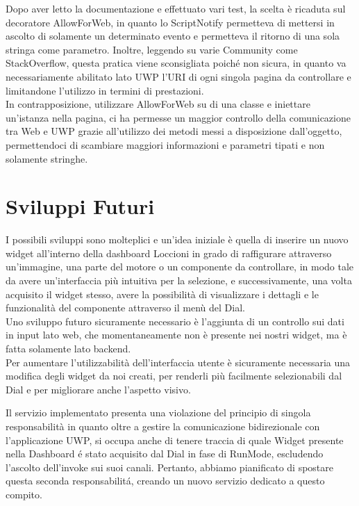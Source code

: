 Dopo aver letto la documentazione e effettuato vari test, la scelta è ricaduta sul decoratore AllowForWeb, in quanto lo ScriptNotify permetteva di mettersi in ascolto di solamente un determinato evento e permetteva il ritorno di una sola stringa come parametro.
Inoltre, leggendo su varie Community come StackOverflow, questa pratica viene sconsigliata poiché non sicura, in quanto va necessariamente abilitato lato UWP l'URI di ogni singola pagina da controllare e limitandone l'utilizzo in termini di prestazioni.\\ 

In contrapposizione, utilizzare AllowForWeb su di una classe e iniettare un'istanza nella pagina, ci ha permesse un maggior controllo della comunicazione tra Web e UWP grazie all'utilizzo dei metodi messi a disposizione dall'oggetto, permettendoci di scambiare maggiori informazioni e parametri tipati e non solamente stringhe.\\

\section{Sviluppi Futuri}

I possibili sviluppi sono molteplici e un’idea iniziale è quella di inserire un nuovo widget all’interno della dashboard Loccioni in grado di raffigurare attraverso un’immagine, una parte del motore o un componente da controllare, in modo tale da avere un’interfaccia più intuitiva per la selezione, e successivamente, una volta acquisito il widget stesso, avere la possibilità di visualizzare i dettagli e le funzionalità del componente attraverso il menù del Dial.\\

Uno sviluppo futuro sicuramente necessario è l’aggiunta di un controllo sui dati in input lato web, che momentaneamente non è presente nei nostri widget, ma è fatta solamente lato backend.\\

Per aumentare l'utilizzabilità dell’interfaccia utente è sicuramente necessaria una modifica degli widget da noi creati, per renderli più facilmente selezionabili dal Dial e per migliorare anche l’aspetto visivo.

Il servizio implementato presenta una violazione del principio di singola responsabilità in quanto oltre a gestire la comunicazione bidirezionale con l'applicazione UWP, si occupa anche di tenere traccia di quale Widget presente nella Dashboard é stato acquisito dal Dial in fase di RunMode, escludendo l'ascolto dell'invoke sui suoi canali.
Pertanto, abbiamo pianificato di spostare questa seconda responsabilitá, creando un nuovo servizio dedicato a questo compito.

